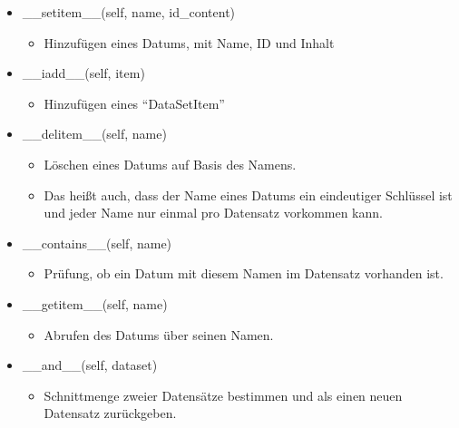 \documentclass[
10pt,
a4paper
parskip=full
]{scrartcl}
\begin{document}
        \begin{itemize}
            \item \_\_setitem\_\_(self, name, id\_content)
                \begin{itemize}
                    \item [] Hinzufügen eines Datums, mit Name, ID und Inhalt
                \end{itemize}
                
            \item \_\_iadd\_\_(self, item)
                \begin{itemize}
                    \item [] Hinzufügen eines "`DataSetItem"'
                \end{itemize}
                
            \item \_\_delitem\_\_(self, name)
                \begin{itemize}
                    \item [] Löschen eines Datums auf Basis des Namens.
                    \item[] Das heißt auch, dass der Name eines Datums ein eindeutiger Schlüssel ist und jeder Name nur einmal pro Datensatz vorkommen kann.
                \end{itemize}
                
            \item \_\_contains\_\_(self, name)
                \begin{itemize}
                    \item [] Prüfung, ob ein Datum mit diesem Namen im Datensatz vorhanden ist.
                \end{itemize}
                
            \item \_\_getitem\_\_(self, name)
                \begin{itemize}
                    \item [] Abrufen des Datums über seinen Namen.
                \end{itemize}

            \item \_\_and\_\_(self, dataset)
                \begin{itemize}
                    \item [] Schnittmenge zweier Datensätze bestimmen und als einen neuen Datensatz zurückgeben.
                \end{itemize}
                

\end{itemize}
\end{document}

